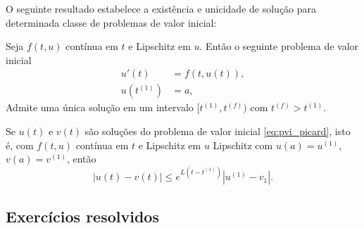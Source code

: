 O seguinte resultado estabelece a existência e unicidade de solução para determinada classe de problemas de valor inicial:
\begin{teo} Seja $f(t, u)$ contínua em $t$ e Lipschitz em $u$. Então o seguinte problema de valor inicial
\begin{equation}\label{eq:pvi_picard}
  \begin{split}
    u'(t)  &= f(t, u(t)), \\
    u(t^{(1)}) &= a,
  \end{split}
\end{equation}
Admite uma única solução em um intervalo $[t^{(1)},t^{(f)})$ com $t^{(f)}>t^{(1)}.$
\end{teo}


\begin{teo}
Se $u(t)$ e $v(t)$ são soluções do problema de valor inicial \eqref{eq:pvi_picard}, isto é, com $f(t, u)$ contínua em $t$ e Lipschitz em $u$ Lipschitz com $u(a)=u^{(1)}$, $v(a)=v^{(1)}$, então
\begin{equation}  |u(t)-v(t)| \leq  e^{L(t-t^{(1)})}|u^{(1)}-v_1|. \end{equation}
\end{teo}

\subsection*{Exercícios resolvidos}

